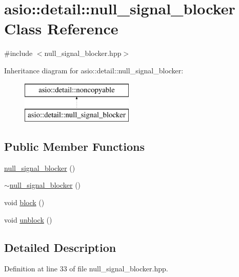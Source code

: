 \hypertarget{classasio_1_1detail_1_1null__signal__blocker}{}\section{asio\+:\+:detail\+:\+:null\+\_\+signal\+\_\+blocker Class Reference}
\label{classasio_1_1detail_1_1null__signal__blocker}


{\ttfamily \#include $<$null\+\_\+signal\+\_\+blocker.\+hpp$>$}

Inheritance diagram for asio\+:\+:detail\+:\+:null\+\_\+signal\+\_\+blocker\+:\begin{figure}[H]
\begin{center}
\leavevmode
\includegraphics[height=2.000000cm]{classasio_1_1detail_1_1null__signal__blocker}
\end{center}
\end{figure}
\subsection*{Public Member Functions}
\begin{DoxyCompactItemize}
\item 
\hyperlink{classasio_1_1detail_1_1null__signal__blocker_a68c8feb7f62fce4a0f4136da2b5b123b}{null\+\_\+signal\+\_\+blocker} ()
\item 
\hyperlink{classasio_1_1detail_1_1null__signal__blocker_abe712eac12fcd8c7c4a231185765338f}{$\sim$null\+\_\+signal\+\_\+blocker} ()
\item 
void \hyperlink{classasio_1_1detail_1_1null__signal__blocker_ad09f0c7acc417d1141d99c77a24f0f3c}{block} ()
\item 
void \hyperlink{classasio_1_1detail_1_1null__signal__blocker_ae021ace5ca610b50aae279ff653c6ba8}{unblock} ()
\end{DoxyCompactItemize}


\subsection{Detailed Description}


Definition at line 33 of file null\+\_\+signal\+\_\+blocker.\+hpp.



